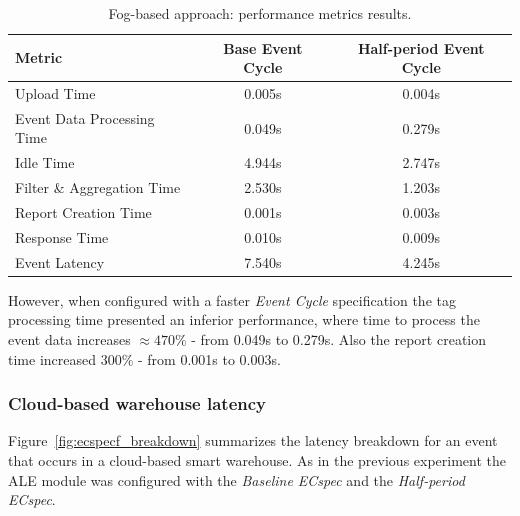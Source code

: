 \begin{table}[ht!]
  \centering
    \begin{tabular}{|l|c|c|}
    \hline
    Metric                            & Base Event Cycle & Half-period Event Cycle \\ \hline
    Upload Time                       & 0.005s           & 0.004s                  \\ \hline
    Event Data Processing Time        & 0.049s           & 0.279s                  \\ \hline
    Idle Time                         & 4.944s           & 2.747s                  \\ \hline
    Filter \& Aggregation Time        & 2.530s           & 1.203s                  \\ \hline
    Report Creation Time              & 0.001s           & 0.003s                  \\ \hline
    Response Time                     & 0.010s           & 0.009s                  \\ \hline
    Event Latency                     & 7.540s           & 4.245s                  \\ \hline
    \end{tabular}
  \caption{Fog-based approach: performance metrics results.}
  \label{table:fog_metrics}
\end{table}

However, when configured with a faster \textit{Event Cycle} specification the tag processing time
presented an inferior performance, where time to process the event data increases $\approx470\%$
- from 0.049s to 0.279s. Also the report creation time increased $300\%$ - from 0.001s to 0.003s.\\

\subsubsection{Cloud-based warehouse latency}
\label{subs:eval_exp_latency_ecspec_fast}
Figure~\ref{fig:ecspecf_breakdown} summarizes the latency breakdown for an event that occurs in a cloud-based
smart warehouse. As in the previous experiment the \gls{ALE} module was configured with the
\textit{Baseline ECspec} and the \textit{Half-period ECspec}.\\

